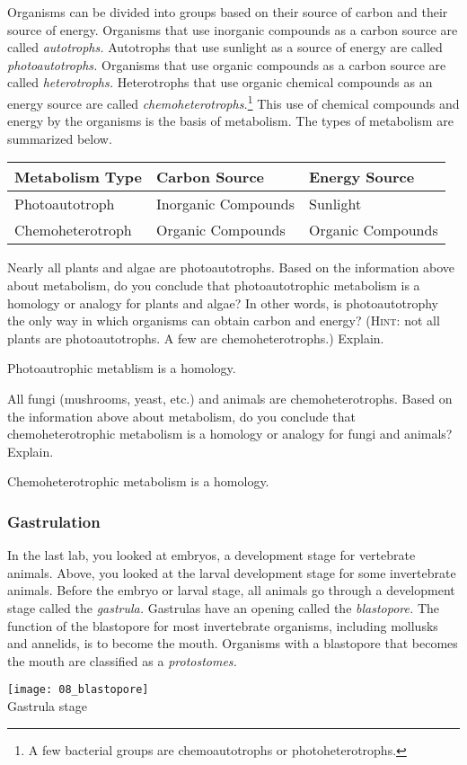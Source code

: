 \documentclass[12pt, hidelinks]{exam}
\newcommand*\AnswerBox[2]{%
    \parbox[t][#1]{0.92\textwidth}{%
    \begin{solution}#2\end{solution}}
    \vspace{\stretch{1}}
}
\begin{document}
\begin{questions}
Organisms can be divided into groups based on their source of carbon and their source of energy. Organisms that use inorganic compounds as a carbon source are called \emph{autotrophs.} Autotrophs that use sunlight as a source of energy are called \emph{photoautotrophs.} 
Organisms that use organic compounds as a carbon source are called \emph{heterotrophs.} Heterotrophs that use organic chemical compounds as an energy source are called \emph{chemoheterotrophs.}\footnote{A few bacterial groups are chemoautotrophs or photoheterotrophs.} This use of chemical compounds and energy  by the organisms is the basis of metabolism. The types of metabolism are summarized below.

\begin{longtable}{L{1.5in}L{1in}L{1in}}
\toprule
Metabolism Type	&	Carbon Source	&	Energy Source \tabularnewline
\midrule
{Photoautotroph}	& Inorganic Compounds	& Sunlight	\tabularnewline
Chemoheterotroph	& Organic Compounds	& Organic Compounds \tabularnewline
\bottomrule
\end{longtable}

\newpage

\question
Nearly all plants and algae are photoautotrophs. Based on the information above about metabolism, do you conclude that photoautotrophic metabolism is a homology or analogy for plants and algae? In other words, is photoautotrophy the only way in which organisms can obtain carbon and energy? (\textsc{Hint:} not all plants are photoautotrophs. A few are chemoheterotrophs.) Explain.

\AnswerBox{3\baselineskip}{Photoautrophic metablism is a homology.}

\question
All fungi (mushrooms, yeast, etc.) and animals are chemoheterotrophs. Based on the information above about metabolism, do you conclude that chemoheterotrophic metabolism is a homology or analogy for fungi and animals? Explain.

\AnswerBox{3\baselineskip}{Chemoheterotrophic metabolism is a homology.}

\subsubsection*{Gastrulation}

\begin{minipage}{0.75\textwidth}%
In the last lab, you looked at embryos, a development stage for
vertebrate animals. Above, you looked at the larval development
stage for some invertebrate animals. Before the embryo or larval stage, all 
animals go through a development stage called the \emph{gastrula.}  
Gastrulas have an opening called the \emph{blastopore.} The function of the blastopore 
 for most invertebrate organisms, including mollusks and annelids, is to become the mouth.
 Organisms with a blastopore that
 becomes the mouth are classified as a \emph{protostomes.} 
\end{minipage}\hfill
\begin{minipage}{0.25\textwidth}%
\centering\texttt{[image: 08\_blastopore]}\\%
{\footnotesize Gastrula stage}%
\end{minipage}


\end{questions}
\end{document}
